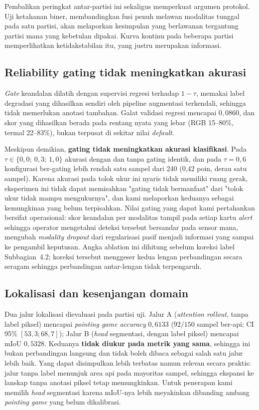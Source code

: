 Pembalikan peringkat antar-partisi ini sekaligus memperkuat argumen protokol.
Uji ketahanan biner, membandingkan fusi penuh melawan modalitas tunggal pada
satu partisi, akan melaporkan kesimpulan yang berlawanan tergantung partisi
mana yang kebetulan dipakai. Kurva kontinu pada beberapa partisi memperlihatkan
ketidakstabilan itu, yang justru merupakan informasi.

\subsection{Reliability gating tidak meningkatkan akurasi}

\emph{Gate} keandalan dilatih dengan supervisi regresi terhadap $1 - \tau$,
memakai label degradasi yang dihasilkan sendiri oleh pipeline augmentasi
terkendali, sehingga tidak memerlukan anotasi tambahan. Galat validasi regresi
mencapai $0{,}0860$, dan skor yang dihasilkan berada pada rentang nyata yang
lebar (RGB 15--80\%, termal 22--83\%), bukan terpusat di sekitar nilai
\emph{default}.

Meskipun demikian, \textbf{gating tidak meningkatkan akurasi klasifikasi}. Pada
$\tau \in \{0{,}0;\ 0{,}3;\ 1{,}0\}$ akurasi dengan dan tanpa gating identik,
dan pada $\tau = 0{,}6$ konfigurasi ber-gating lebih rendah satu sampel dari 240
(0{,}42 poin, derau satu sampel). Karena akurasi pada tolok ukur ini nyaris
tidak memiliki ruang gerak, eksperimen ini tidak dapat memisahkan "gating tidak
bermanfaat" dari "tolok ukur tidak mampu mengukurnya", dan kami melaporkan
keduanya sebagai kemungkinan yang belum terpisahkan. Nilai gating yang dapat
kami pertahankan bersifat operasional: skor keandalan per modalitas tampil pada
setiap kartu \emph{alert} sehingga operator mengetahui deteksi tersebut
bersandar pada sensor mana, mengubah \emph{modality dropout} dari regularisasi
pasif menjadi informasi yang sampai ke pengambil keputusan. Angka ablation ini
dihitung sebelum koreksi label Subbagian~4.2; koreksi tersebut menggeser kedua
lengan perbandingan secara seragam sehingga perbandingan antar-lengan tidak
terpengaruh.

\subsection{Lokalisasi dan kesenjangan domain}

Dua jalur lokalisasi dievaluasi pada partisi uji. Jalur A (\emph{attention
rollout}, tanpa label piksel) mencapai \emph{pointing game accuracy} $0{,}6133$
($92/150$ sampel ber-api; CI 95\% $[53{,}3; 68{,}7]$); Jalur B (\emph{head}
segmentasi, dengan label piksel) mencapai mIoU $0{,}5328$. Keduanya
\textbf{tidak diukur pada metrik yang sama}, sehingga ini bukan perbandingan
langsung dan tidak boleh dibaca sebagai salah satu jalur lebih baik. Yang dapat
disimpulkan lebih terbatas namun relevan secara praktis: jalur tanpa label
menunjuk area api pada mayoritas sampel, sehingga ekspansi ke lanskap tanpa
anotasi piksel tetap memungkinkan. Untuk penerapan kami memilih \emph{head}
segmentasi karena mIoU-nya lebih meyakinkan dibanding ambang \emph{pointing
game} yang belum dikalibrasi.

